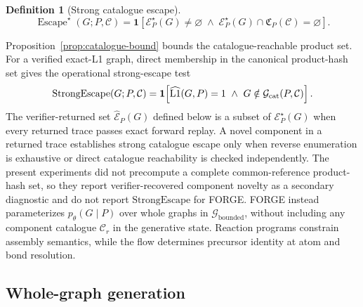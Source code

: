 \documentclass{article}
\newtheorem{definition}[theorem]{Definition}
\begin{document}
\begin{definition}[Strong catalogue escape]
\label{def:catalogue-escape}
\begin{equation}
    \operatorname{Escape}^{\star}(G;P,\mathcal C)
    =
    \mathbf{1}\!\left[
        \mathcal E_P^\star(G)\neq\varnothing
        \;\land\;
        \mathcal E_P^\star(G)\cap\mathfrak C_P(\mathcal C)=\varnothing
    \right].
\end{equation}
\end{definition}
Proposition~\ref{prop:catalogue-bound} bounds the catalogue-reachable product set.
For a verified exact-L1 graph, direct membership in the canonical product-hash set gives the
operational strong-escape test
\begin{equation}
    \mathrm{StrongEscape}(G;P,\mathcal C)
    =\mathbf 1\!\left[
       \widehat{\mathrm{L1}}(G,P)=1\ \land\
       G\notin\mathcal G_{\rm cat}(P,\mathcal C)
    \right].
\end{equation}
The verifier-returned set $\widehat{\mathcal E}_P(G)$ defined below is a subset of
$\mathcal E_P^\star(G)$ when every returned trace passes exact forward replay.
A novel component in a returned trace establishes strong catalogue escape only when reverse
enumeration is exhaustive or direct catalogue reachability is checked independently.
The present experiments did not precompute a complete common-reference product-hash set, so they
report verifier-recovered component novelty as a secondary diagnostic and do not report
$\mathrm{StrongEscape}$ for FORGE.
FORGE instead parameterizes $p_\theta(G\mid P)$ over whole graphs in
$\mathcal{G}_{\mathrm{bounded}}$, without including any component catalogue $\mathcal{C}_r$ in the
generative state.
Reaction programs constrain assembly semantics, while the flow determines precursor identity at atom
and bond resolution.

\subsection{Whole-graph generation}
\end{document}
